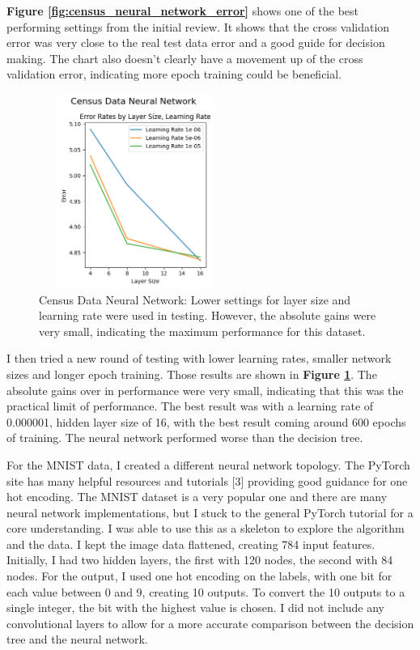 \documentclass[letterpaper]{article} %
\begin{document}
\textbf{Figure \ref{fig:census_neural_network_error}} shows one of the best performing settings from the initial review.  It shows that the cross validation error was very close to the real test data error and a good guide for decision making.  The chart also doesn't clearly have a movement up of the cross validation error, indicating more epoch training could be beneficial.

\begin{figure}[h]
\centering
\includegraphics[width=2.5in, height=2.5in]{figures/Census_Data_Neural_Network_Error_Rates_by_Layer_Size__Learning_Rate_census_v2.png}
\caption{Census Data Neural Network:  Lower settings for layer size and learning rate were used in testing.   However, the absolute gains were very small, indicating the maximum performance for this dataset.   }
\label{fig:census_neural_network_v2}
\end{figure}

I then tried a new round of testing with lower learning rates, smaller network sizes and longer epoch training.  Those results are shown in \textbf{Figure \ref{fig:census_neural_network_v2}}.  The absolute gains over in performance were very small, indicating that this was the practical limit of performance.  The best result was with a learning rate of 0.000001, hidden layer size of 16, with the best result coming around 600 epochs of training.  The neural network performed worse than the decision tree. 

For the MNIST data, I created a different neural network topology.  The PyTorch site has many helpful resources and tutorials [3] providing good guidance for one hot encoding.  The MNIST dataset is a very popular one and there are many neural network implementations, but I stuck to the general PyTorch tutorial for a core understanding.  I was able to use this as a skeleton to explore the algorithm and the data. I kept the image data flattened, creating 784 input features.  Initially, I had two hidden layers, the first with 120 nodes, the second with 84 nodes.  For the output, I used one hot encoding on the labels, with one bit for each value between 0 and 9, creating 10 outputs.  To convert the 10 outputs to a single integer, the bit with the highest value is chosen.  I did not include any convolutional layers to allow for a more accurate comparison between the decision tree and the neural network.
\end{document}
